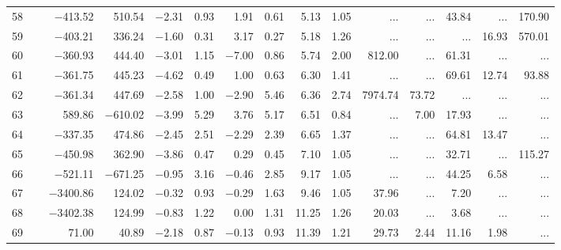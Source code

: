 \begin{table*}[p]
{\begin{tabular}{l@{ }r@{ \ }rr@{ \ }rr@{ \ }rrrr@{ \ }r@{ \ }r@{ \ }r@{ \ }r}
 58   \ \dotfill \  &  $-$413.52 &    510.54 &  $-$2.31 &   0.93 &    1.91 &   0.61&    5.13 &   1.05&    ...     &    ...     &       43.84 &    ...     &      170.90   \\     
 59   \ \dotfill \  &  $-$403.21 &    336.24 &  $-$1.60 &   0.31 &    3.17 &   0.27&    5.18 &   1.26&    ...     &    ...     &    ...     &       16.93 &      570.01   \\     
 60   \ \dotfill \  &  $-$360.93 &    444.40 &  $-$3.01 &   1.15 &  $-$7.00 &   0.86&    5.74 &   2.00&      812.00 &    ...     &       61.31 &    ...     &    ...       \\     
 61   \ \dotfill \  &  $-$361.75 &    445.23 &  $-$4.62 &   0.49 &    1.00 &   0.63&    6.30 &   1.41&    ...     &    ...     &       69.61 &       12.74 &       93.88   \\     
 62   \ \dotfill \  &  $-$361.34 &    447.69 &  $-$2.58 &   1.00 &  $-$2.90 &   5.46&    6.36 &   2.74&     7974.74 &       73.72 &    ...     &    ...     &    ...       \\     
 63   \ \dotfill \  &    589.86 &  $-$610.02 &  $-$3.99 &   5.29 &    3.76 &   5.17&    6.51 &   0.84&    ...     &        7.00 &       17.93 &    ...     &    ...       \\     
 64   \ \dotfill \  &  $-$337.35 &    474.86 &  $-$2.45 &   2.51 &  $-$2.29 &   2.39&    6.65 &   1.37&    ...     &    ...     &       64.81 &       13.47 &    ...       \\     
 65   \ \dotfill \  &  $-$450.98 &    362.90 &  $-$3.86 &   0.47 &    0.29 &   0.45&    7.10 &   1.05&    ...     &    ...     &       32.71 &    ...     &      115.27   \\     
 66   \ \dotfill \  &  $-$521.11 &  $-$671.25 &  $-$0.95 &   3.16 &  $-$0.46 &   2.85&    9.17 &   1.05&    ...     &    ...     &       44.25 &        6.58 &    ...       \\     
 67   \ \dotfill \  & $-$3400.86 &    124.02 &  $-$0.32 &   0.93 &  $-$0.29 &   1.63&    9.46 &   1.05&       37.96 &    ...     &        7.20 &    ...     &    ...       \\     
 68   \ \dotfill \  & $-$3402.38 &    124.99 &  $-$0.83 &   1.22 &    0.00 &   1.31&   11.25 &   1.26&       20.03 &    ...     &        3.68 &    ...     &    ...       \\     
 69   \ \dotfill \  &     71.00 &     40.89 &  $-$2.18 &   0.87 &  $-$0.13 &   0.93&   11.39 &   1.21&       29.73 &        2.44 &       11.16 &        1.98 &    ...       \\     

\end{tabular}}
\end{table*}
